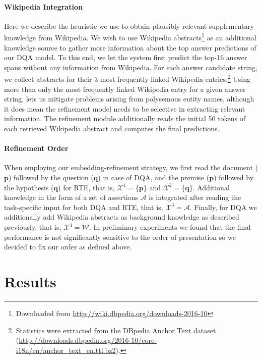 \documentclass[11pt,a4paper]{article}
\begin{document}
\paragraph{Wikipedia Integration}
Here we describe the heuristic we use to obtain plausibly relevant supplementary knowledge from Wikipedia. We wish to use Wikipedia abstracts\footnote{Downloaded from \url{http://wiki.dbpedia.org/downloads-2016-10}} as an additional knowledge source to gather more information about the top answer predictions of our DQA model. To this end, we let the system first predict the top-16 answer spans without any information from Wikipedia. For each answer candidate string, we collect abstracts for their 3 most frequently linked Wikipedia entries.\footnote{Statistics were extracted from the DBpedia Anchor Text dataset (\url{http://downloads.dbpedia.org/2016-10/core-i18n/en/anchor_text_en.ttl.bz2}).} Using more than only the most frequently linked Wikipedia entry for a given answer string, lets us mitigate problems arising from polysemous entity names, although it does mean the refinement model needs to be selective in extracting relevant information. The refinement module additionally reads the initial 50 tokens of each retrieved Wikipedia abstract and computes the final predictions.

\paragraph{Refinement Order}
When employing our embedding-refinement strategy, we first read the document ($\boldsymbol{p}$) followed by the question ($\boldsymbol{q}$) in case of DQA, and the premise ($\boldsymbol{p}$) followed by the hypothesis ($\boldsymbol{q}$) for RTE, that is, $\mathcal{X}^1=\{\boldsymbol{p}\}$ and $\mathcal{X}^2=\{\boldsymbol{q}\}$. Additional knowledge in the form of a set of assertions $\mathcal{A}$ is integrated after reading the task-specific input for both DQA and RTE, that is, $\mathcal{X}^3 = \mathcal{A}$. Finally, for DQA we additionally add Wikipedia abstracts as background knowledge as described previously, that is, $\mathcal{X}^4 = \mathcal{W}$.
In preliminary experiments we found that the final performance is not significantly sensitive to the order of presentation so we decided to fix our order as defined above.

\section{Results}
\label{sec:results}
\end{document}
